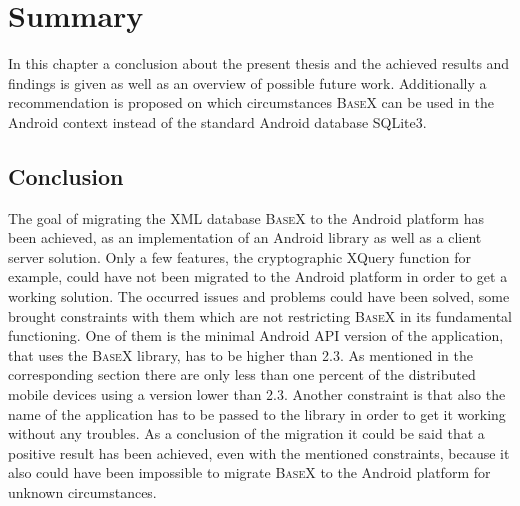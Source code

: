 \chapter{Summary}
\label{cha:summery}
In this chapter a conclusion about the present thesis and the achieved results and findings is given as well as an overview of possible future work.
Additionally a recommendation is proposed on which circumstances \textsc{BaseX} can be used in the Android context instead of the standard Android database SQLite3.
\section{Conclusion}
\label{sec:summery:conclusion}
The goal of migrating the XML database \textsc{BaseX} to the Android platform has been achieved, as an implementation of an Android library as well as a client server solution.
Only a few features, the cryptographic XQuery function for example, could have not been migrated to the Android platform in order to get a working solution.
The occurred issues and problems could have been solved, some brought constraints with them which are not restricting \textsc{BaseX} in its fundamental functioning.
One of them is the minimal Android API version of the application, that uses the \textsc{BaseX} library, has to be higher than 2.3.
As mentioned in the corresponding section there are only less than one percent of the distributed mobile devices using a version lower than 2.3.
Another constraint is that also the name of the application has to be passed to the library in order to get it working without any troubles.
As a conclusion of the migration it could be said that a positive result has been achieved, even with the mentioned constraints, because it also could have been impossible to migrate \textsc{BaseX} to the Android platform for unknown circumstances.





